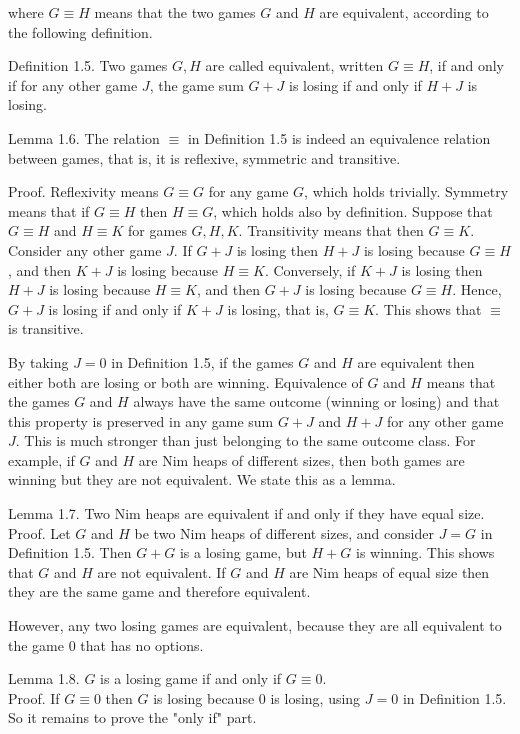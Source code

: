\documentclass[12pt]{article}
\begin{document}
where $G \equiv H$ means that the two games $G$ and $H$ are equivalent, according to the following definition.

Definition 1.5. Two games $G, H$ are called equivalent, written $G \equiv H$, if and only if for any other game $J$, the game sum $G+J$ is losing if and only if $H+J$ is losing.

Lemma 1.6. The relation $\equiv$ in Definition 1.5 is indeed an equivalence relation between games, that is, it is reflexive, symmetric and transitive.

Proof. Reflexivity means $G \equiv G$ for any game $G$, which holds trivially. Symmetry means that if $G \equiv H$ then $H \equiv G$, which holds also by definition. Suppose that $G \equiv H$ and $H \equiv K$ for games $G, H, K$. Transitivity means that then $G \equiv K$. Consider any other game $J$. If $G+J$ is losing then $H+J$ is losing because $G \equiv H$, and then $K+J$ is losing because $H \equiv K$. Conversely, if $K+J$ is losing then $H+J$ is losing because $H \equiv K$, and then $G+J$ is losing because $G \equiv H$. Hence, $G+J$ is losing if and only if $K+J$ is losing, that is, $G \equiv K$. This shows that $\equiv$ is transitive.

By taking $J=0$ in Definition 1.5, if the games $G$ and $H$ are equivalent then either both are losing or both are winning. Equivalence of $G$ and $H$ means that the games $G$ and $H$ always have the same outcome (winning or losing) and that this property is preserved in any game sum $G+J$ and $H+J$ for any other game $J$. This is much stronger than just belonging to the same outcome class. For example, if $G$ and $H$ are Nim heaps of different sizes, then both games are winning but they are not equivalent. We state this as a lemma.

Lemma 1.7. Two Nim heaps are equivalent if and only if they have equal size.\\
Proof. Let $G$ and $H$ be two Nim heaps of different sizes, and consider $J=G$ in Definition 1.5. Then $G+G$ is a losing game, but $H+G$ is winning. This shows\\
that $G$ and $H$ are not equivalent. If $G$ and $H$ are Nim heaps of equal size then they are the same game and therefore equivalent.

However, any two losing games are equivalent, because they are all equivalent to the game 0 that has no options.

Lemma 1.8. $G$ is a losing game if and only if $G \equiv 0$.\\
Proof. If $G \equiv 0$ then $G$ is losing because 0 is losing, using $J=0$ in Definition 1.5. So it remains to prove the "only if" part.
\end{document}
